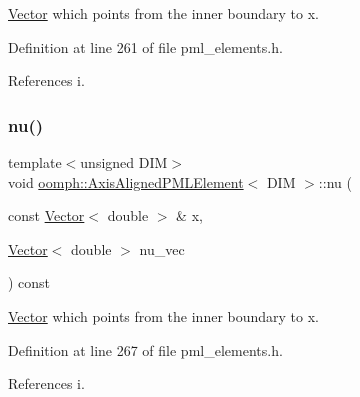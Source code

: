 \hyperlink{classoomph_1_1Vector}{Vector} which points from the inner boundary to x. 



Definition at line 261 of file pml\+\_\+elements.\+h.



References i.

\mbox{\label{classoomph_1_1AxisAlignedPMLElement_ae278a54184e8134f57aa361bfc1cc975}} 
\subsubsection{\texorpdfstring{nu()}{nu()}\hspace{0.1cm}{\footnotesize\ttfamily [2/2]}}
{\footnotesize\ttfamily template$<$unsigned D\+IM$>$ \\
void \hyperlink{classoomph_1_1AxisAlignedPMLElement}{oomph\+::\+Axis\+Aligned\+P\+M\+L\+Element}$<$ D\+IM $>$\+::nu (\begin{DoxyParamCaption}\item[{const \hyperlink{classoomph_1_1Vector}{Vector}$<$ double $>$ \&}]{x,  }\item[{\hyperlink{classoomph_1_1Vector}{Vector}$<$ double $>$}]{nu\+\_\+vec }\end{DoxyParamCaption}) const\hspace{0.3cm}{\ttfamily [inline]}}



\hyperlink{classoomph_1_1Vector}{Vector} which points from the inner boundary to x. 



Definition at line 267 of file pml\+\_\+elements.\+h.



References i.

\mbox{\label{classoomph_1_1AxisAlignedPMLElement_adcb4bb14ff2f185cdfd31aa51b1f015d}} 
